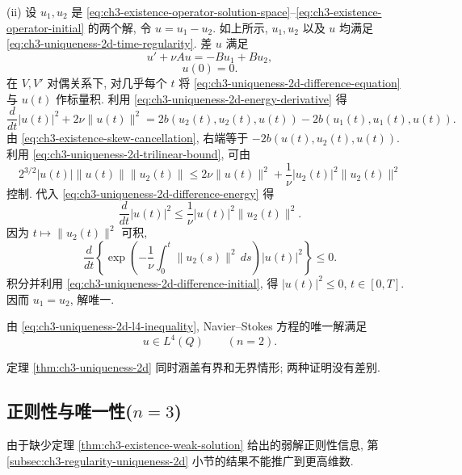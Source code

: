 \begin{Proof}
(ii) 设 $u_1,u_2$ 是 \eqref{eq:ch3-existence-operator-solution-space}--\eqref{eq:ch3-existence-operator-initial} 的两个解, 令 $u=u_1-u_2$. 如上所示, $u_1,u_2$ 以及 $u$ 均满足 \eqref{eq:ch3-uniqueness-2d-time-regularity}. 差 $u$ 满足
\begin{equation}
u'+\nu Au=-Bu_1+Bu_2,
\label{eq:ch3-uniqueness-2d-difference-equation}
\end{equation}
\begin{equation}
u(0)=0.
\label{eq:ch3-uniqueness-2d-difference-initial}
\end{equation}
在 $V,V'$ 对偶关系下, 对几乎每个 $t$ 将 \eqref{eq:ch3-uniqueness-2d-difference-equation} 与 $u(t)$ 作标量积. 利用 \eqref{eq:ch3-uniqueness-2d-energy-derivative} 得
\begin{equation}
\frac d{dt}|u(t)|^2+2\nu\lVert u(t)\rVert^2
=2b(u_2(t),u_2(t),u(t))-2b(u_1(t),u_1(t),u(t)).
\label{eq:ch3-uniqueness-2d-difference-energy}
\end{equation}
由 \eqref{eq:ch3-existence-skew-cancellation}, 右端等于 $-2b(u(t),u_2(t),u(t))$. 利用 \eqref{eq:ch3-uniqueness-2d-trilinear-bound}, 可由
\[
2^{3/2}|u(t)|\lVert u(t)\rVert\lVert u_2(t)\rVert
\leq2\nu\lVert u(t)\rVert^2+\frac1\nu|u_2(t)|^2\lVert u_2(t)\rVert^2
\]
控制. 代入 \eqref{eq:ch3-uniqueness-2d-difference-energy} 得
\[
\frac d{dt}|u(t)|^2\leq\frac1\nu|u(t)|^2\lVert u_2(t)\rVert^2.
\]
因为 $t\mapsto\lVert u_2(t)\rVert^2$ 可积,
\[
\frac d{dt}\left\{
\exp\left(-\frac1\nu\int_0^t\lVert u_2(s)\rVert^2\,ds\right)|u(t)|^2
\right\}\leq0.
\]
积分并利用 \eqref{eq:ch3-uniqueness-2d-difference-initial}, 得 $|u(t)|^2\leq0$, $t\in[0,T]$. 因而 $u_1=u_2$, 解唯一.
\end{Proof}

\hypertarget{chapter-03-page-215}{}
\begin{Remark}
\label{rem:ch3-uniqueness-2d-l4q}
由 \eqref{eq:ch3-uniqueness-2d-l4-inequality}, Navier--Stokes 方程的唯一解满足
\begin{equation}
u\in L^4(Q)\qquad(n=2).
\label{eq:ch3-uniqueness-2d-l4q}
\end{equation}
\end{Remark}

\begin{Remark}
\label{rem:ch3-uniqueness-2d-unbounded}
定理 \ref{thm:ch3-uniqueness-2d} 同时涵盖有界和无界情形; 两种证明没有差别.
\end{Remark}

\subsection{正则性与唯一性($n=3$)}
\label{subsec:ch3-regularity-uniqueness-3d}
由于缺少定理 \ref{thm:ch3-existence-weak-solution} 给出的弱解正则性信息, 第 \ref{subsec:ch3-regularity-uniqueness-2d} 小节的结果不能推广到更高维数.

